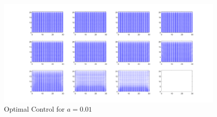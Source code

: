 \documentclass[11pt, a4paper]{article}
\theoremstyle{definition}
\begin{document}
	\begin{figure}[h]
		\centering
		\includegraphics[scale=0.35]{F3.png}
		\caption{Optimal Control for $a = 0.01$} 
		\label{F3}
	\end{figure}
	
	
	
\end{document}
